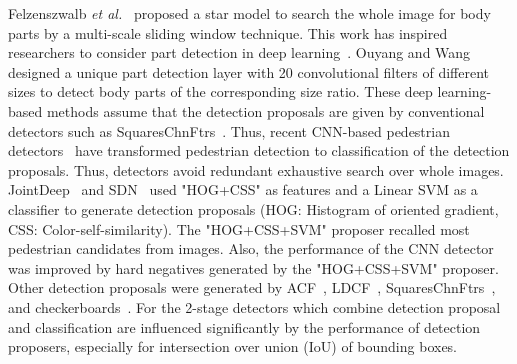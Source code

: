 \documentclass[journal]{IEEEtran}
\begin{document}
Felzenszwalb \emph{et al.}~\cite{felzenszwalb2008a, felzenszwalb2010object} proposed a star model to search the whole image for body parts by a multi-scale sliding window technique. This work has inspired researchers to consider part detection in deep learning~\cite{ouyang2012discriminative, tian2015deep, ouyang2013joint, ouyang2013modeling, luo2014switchable}. Ouyang and Wang~\cite{ouyang2013joint} designed a unique part detection layer with 20 convolutional filters of different sizes to detect body parts of the corresponding size ratio. These deep learning-based methods assume that the detection proposals are given by conventional detectors such as SquaresChnFtrs~\cite{benenson2013seeking}. Thus, recent CNN-based pedestrian detectors~\cite{ouyang2012discriminative, tian2015deep, ouyang2013joint, ouyang2013modeling, luo2014switchable, tian2015pedestrian, angelova2015real, li2015scale, hosang2015taking} have transformed pedestrian detection to classification of the detection proposals. Thus, detectors avoid redundant exhaustive search over whole images. JointDeep~\cite{ouyang2013joint} and SDN~\cite{luo2014switchable} used "HOG+CSS" as features and a Linear SVM as a classifier to generate detection proposals (HOG: Histogram of oriented gradient, CSS: Color-self-similarity). The "HOG+CSS+SVM" proposer recalled most pedestrian candidates from images. Also, the performance of the CNN detector was improved by hard negatives generated by the "HOG+CSS+SVM" proposer. Other detection proposals were generated by ACF~\cite{dollar2014fast}, LDCF~\cite{nam2014local}, SquaresChnFtrs~\cite{benenson2013seeking}, and checkerboards~\cite{zhang2015filtered}. For the 2-stage detectors which combine detection proposal and classification are influenced significantly by the performance of detection proposers, especially for intersection over union (IoU) of bounding boxes.
\end{document}
